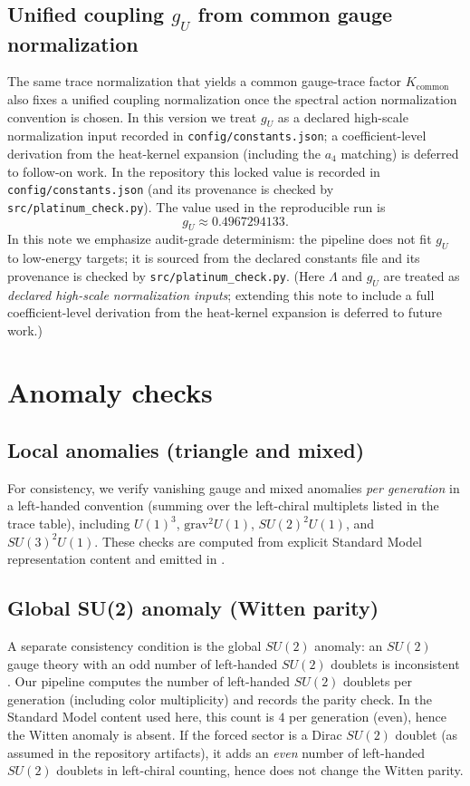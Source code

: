 \documentclass[11pt]{article}
\begin{document}
\subsection{Unified coupling \texorpdfstring{$g_U$}{gU} from common gauge normalization}
The same trace normalization that yields a common gauge-trace factor $K_{\mathrm{common}}$ also fixes a unified coupling normalization once the spectral action normalization convention is chosen. In this version we treat $g_U$ as a declared high-scale normalization input recorded in \texttt{config/constants.json}; a coefficient-level derivation from the heat-kernel expansion (including the $a_4$ matching) is deferred to follow-on work. In the repository this locked value is recorded in \texttt{config/constants.json} (and its provenance is checked by \texttt{src/platinum\_check.py}). The value used in the reproducible run is
\begin{equation}
g_U \approx 0.4967294133.
\end{equation}
In this note we emphasize audit-grade determinism: the pipeline does not fit $g_U$ to low-energy targets; it is sourced from the declared constants file and its provenance is checked by \texttt{src/platinum\_check.py}. (Here $\Lambda$ and $g_U$ are treated as \emph{declared high-scale normalization inputs}; extending this note to include a full coefficient-level derivation from the heat-kernel expansion is deferred to future work.)

\section{Anomaly checks}
\subsection{Local anomalies (triangle and mixed)}
For consistency, we verify vanishing gauge and mixed anomalies \emph{per generation} in a left-handed convention (summing over the left-chiral multiplets listed in the trace table), including $U(1)^3$, $\mathrm{grav}^2 U(1)$, $SU(2)^2 U(1)$, and $SU(3)^2 U(1)$. These checks are computed from explicit Standard Model representation content and emitted in \texttt{}.

\subsection{Global SU(2) anomaly (Witten parity)}
A separate consistency condition is the global $SU(2)$ anomaly: an $SU(2)$ gauge theory with an odd number of left-handed $SU(2)$ doublets is inconsistent \cite{Witten1982}.
Our pipeline computes the number of left-handed $SU(2)$ doublets per generation (including color multiplicity) and records the parity check. In the Standard Model content used here, this count is $4$ per generation (even), hence the Witten anomaly is absent. If the forced sector is a Dirac $SU(2)$ doublet (as assumed in the repository artifacts), it adds an \emph{even} number of left-handed $SU(2)$ doublets in left-chiral counting, hence does not change the Witten parity.
\end{document}
